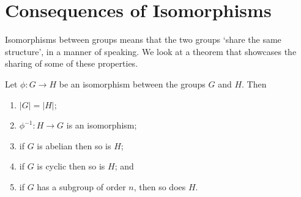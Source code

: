 \section{Consequences of Isomorphisms}
Isomorphisms between groups means that the two groups `share the same structure', in a manner of speaking. We look at a theorem that showcases the sharing of some of these properties.
\begin{theorem}\label{thrm-isomorphism-consequences}
    Let $\phi: G \to H$ be an isomorphism between the groups $G$ and $H$. Then
    \begin{enumerate}
        \item $|G| = |H|$;
        \item $\phi^{-1}: H \to G$ is an isomorphism;
        \item if $G$ is abelian then so is $H$;
        \item if $G$ is cyclic then so is $H$; and
        \item if $G$ has a subgroup of order $n$, then so does $H$.
    \end{enumerate}
\end{theorem}

